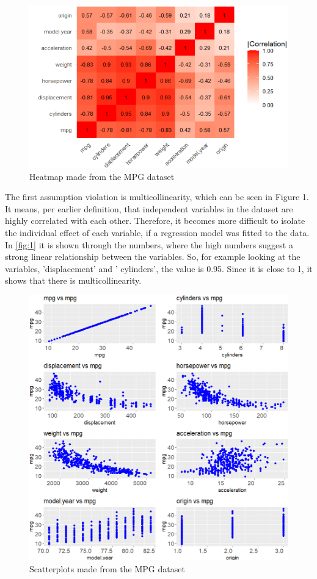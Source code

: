 \begin{figure}
	\centering
	\centering
	\includegraphics{billder/1.png}
	\caption{Heatmap made from the MPG dataset}
	\label{fig:1}
\end{figure}

\noindent The first assumption violation is multicollinearity, which can be seen in Figure 1. It means, per earlier definition, that independent variables in the dataset are highly correlated with each other. Therefore, it becomes more difficult to isolate the individual effect of each variable, if a regression model was fitted to the data. In \autoref{fig:1} it is shown through the numbers, where the high numbers suggest a strong linear relationship between the variables. So, for example looking at the variables, 'displacement' and ' cylinders', the value is 0.95. Since it is close to 1, it shows that there is multicollinearity. \newline


\begin{figure}[h]
	\includegraphics[width=\linewidth]{billder/2.png}
	\caption{Scatterplots made from the MPG dataset}
	\label{fig:2}
\end{figure}

